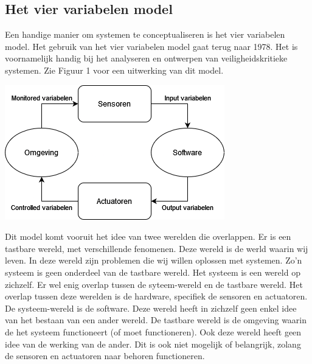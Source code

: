 \documentclass{article}
\begin{document}
		\subsection{Het vier variabelen model}
		
		Een handige manier om systemen te conceptualiseren is het vier variabelen model. Het gebruik van het vier variabelen model gaat terug naar 1978. Het is voornamelijk handig bij het analyseren en ontwerpen van veiligheidskritieke systemen. \cite{patcas2014system} Zie Figuur 1 voor een uitwerking van dit model. \par
		
		\begin{center}
			\begin{minipage}{0.48\linewidth}
				\includegraphics[width=\linewidth]{4variabelen.png}
			\end{minipage}
			\hfill
		\end{center}
Dit model komt vooruit het idee van twee werelden die overlappen. Er is een tastbare wereld, met verschillende fenomenen. Deze wereld is de werld waarin wij leven. In deze wereld zijn problemen die wij willen oplossen met systemen. Zo'n systeem is geen onderdeel van de tastbare wereld. Het systeem is een wereld op zichzelf. Er wel enig overlap tussen de syteem-wereld en de tastbare wereld. Het overlap tussen deze werelden is de hardware, specifiek de sensoren en actuatoren. \\
De systeem-wereld is de software. Deze wereld heeft in zichzelf geen enkel idee van het bestaan van een ander wereld. De tastbare wereld is de omgeving waarin de het systeem functioneert (of moet functioneren). Ook deze wereld heeft geen idee van de werking van de ander. Dit is ook niet mogelijk of belangrijk, zolang de sensoren en actuatoren naar behoren functioneren. \\
\newpage
\end{document}
